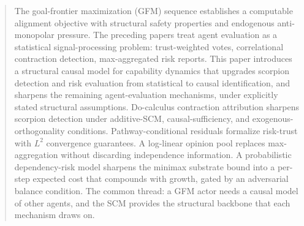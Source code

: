 \begin{abstract}
The goal-frontier maximization (GFM) sequence establishes a computable
    alignment objective with structural safety properties and endogenous
    anti-monopolar pressure. The preceding papers treat agent evaluation
    as a statistical signal-processing problem: trust-weighted votes,
    correlational contraction detection, max-aggregated risk reports.
    This paper introduces a structural causal model for capability
    dynamics that upgrades scorpion detection and risk evaluation
    from statistical to causal identification, and sharpens the
    remaining agent-evaluation mechanisms, under explicitly stated
    structural assumptions.
    Do-calculus contraction attribution sharpens scorpion
    detection under additive-SCM, causal-sufficiency, and
    exogenous-orthogonality conditions.
    Pathway-conditional residuals formalize risk-trust with $L^2$
    convergence guarantees. A log-linear opinion pool replaces
    max-aggregation without discarding independence information. A
    probabilistic dependency-risk model sharpens the minimax substrate
    bound into a per-step expected cost that compounds with growth,
    gated by an adversarial balance condition. The common thread:
    a GFM actor needs a causal model of other agents, and the SCM
    provides the structural backbone that each mechanism draws on.
\end{abstract}
